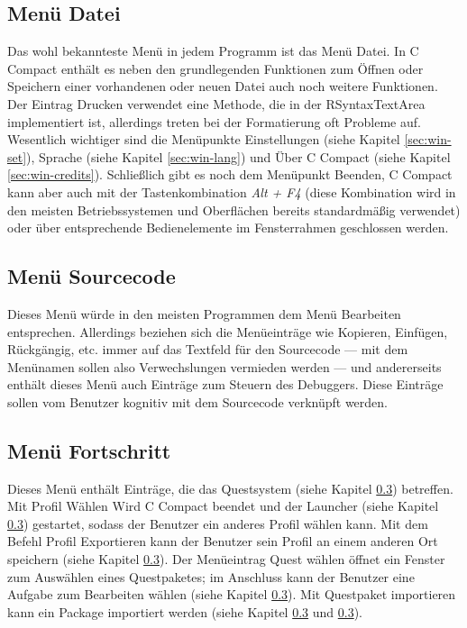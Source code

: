 \subsection{Menü \glqq{}Datei\grqq{}}
\label{sec:gui-main-menu-file}
Das wohl bekannteste Menü in jedem Programm ist das Menü \glqq{}Datei\grqq{}. In C Compact enthält es neben den grundlegenden Funktionen zum Öffnen oder Speichern einer vorhandenen oder neuen Datei auch noch weitere Funktionen. Der Eintrag \glqq{}Drucken\grqq{} verwendet eine Methode, die in der RSyntaxTextArea implementiert ist, allerdings treten bei der Formatierung oft Probleme auf. Wesentlich wichtiger sind die Menüpunkte \glqq{}Einstellungen\grqq{} (siehe Kapitel \ref{sec:win-set}), \glqq{}Sprache\grqq{} (siehe Kapitel \ref{sec:win-lang}) und \glqq{}Über C Compact\grqq{} (siehe Kapitel \ref{sec:win-credits}). Schließlich gibt es noch dem Menüpunkt \glqq{}Beenden\grqq{}, C Compact kann aber auch mit der Tastenkombination \emph{Alt + F4} (diese Kombination wird in den meisten Betriebssystemen und Oberflächen bereits standardmäßig verwendet) oder über entsprechende Bedienelemente im Fensterrahmen geschlossen werden.

\subsection{Menü \glqq{}Sourcecode\grqq{}}
\label{sec:gui-menu-code}
Dieses Menü würde in den meisten Programmen dem Menü \glqq{}Bearbeiten\grqq{} entsprechen. Allerdings beziehen sich die Menüeinträge wie \glqq{}Kopieren\grqq{}, \glqq{}Einfügen\grqq{}, \glqq{}Rückgängig\grqq{}, etc. immer auf das Textfeld für den Sourcecode --- mit dem Menünamen sollen also Verwechslungen vermieden werden --- und andererseits enthält dieses Menü auch Einträge zum Steuern des Debuggers. Diese Einträge sollen vom Benutzer kognitiv mit dem Sourcecode verknüpft werden.

\subsection{Menü \glqq{}Fortschritt\grqq{}}
Dieses Menü enthält Einträge, die das Questsystem (siehe Kapitel \ref{}) betreffen. Mit \glqq{}Profil Wählen\grqq{} Wird C Compact beendet und der Launcher (siehe Kapitel \ref{}) gestartet, sodass der Benutzer ein anderes Profil wählen kann. Mit dem Befehl \glqq{}Profil Exportieren\grqq{} kann der Benutzer sein Profil an einem anderen Ort speichern (siehe Kapitel \ref{}). Der Menüeintrag \glqq{}Quest wählen\grqq{} öffnet ein Fenster zum Auswählen eines Questpaketes; im Anschluss kann der Benutzer eine Aufgabe zum Bearbeiten wählen (siehe Kapitel \ref{}). Mit \glqq{}Questpaket importieren\grqq{} kann ein Package importiert werden (siehe Kapitel \ref{} und \ref{}).

